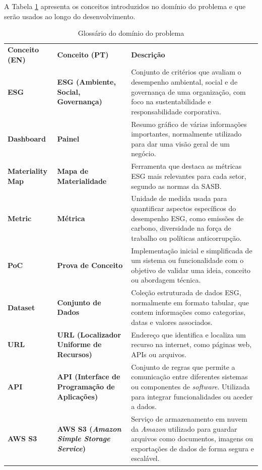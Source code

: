 A Tabela \ref{tab:glossario_dominio} apresenta os conceitos introduzidos no domínio do problema e que serão usados ao longo do desenvolvimento.

\begin{table}[H]
    \renewcommand{\arraystretch}{1.2}
    \setlength{\tabcolsep}{10pt}
    \centering
    \begin{tabular}{>{\bfseries}p{2.5cm} >{\bfseries}p{4cm} p{8cm}}
        \rowcolor{purple!40}
        Conceito (EN) & Conceito (PT) & \textbf{Descrição} \\
        ESG & ESG (Ambiente, Social, Governança) & Conjunto de critérios que avaliam o desempenho ambiental, social e de governança de uma organização, com foco na sustentabilidade e responsabilidade corporativa. \\
        Dashboard & Painel & Resumo gráfico de várias informações importantes, normalmente utilizado para dar uma visão geral de um negócio. \\
        Materiality Map & Mapa de Materialidade & Ferramenta que destaca as métricas ESG mais relevantes para cada setor, segundo as normas da SASB. \\
        Metric & Métrica & Unidade de medida usada para quantificar aspectos específicos do desempenho ESG, como emissões de carbono, diversidade na força de trabalho ou políticas anticorrupção. \\
        PoC & Prova de Conceito & Implementação inicial e simplificada de um sistema ou funcionalidade com o objetivo de validar uma ideia, conceito ou abordagem técnica. \\
        Dataset & Conjunto de Dados & Coleção estruturada de dados ESG, normalmente em formato tabular, que contem informações como categorias, datas e valores associados. \\
        URL & URL (Localizador Uniforme de Recursos) & Endereço que identifica e localiza um recurso na internet, como páginas web, APIs ou arquivos. \\
        API & API (Interface de Programação de Aplicações) & Conjunto de regras que permite a comunicação entre diferentes sistemas ou componentes de \textit{software}. Utilizada para integrar funcionalidades ou aceder a dados. \\
        AWS S3 & AWS S3 (\textit{Amazon Simple Storage Service}) & Serviço de armazenamento em nuvem da \textit{Amazon} utilizado para guardar arquivos como documentos, imagens ou exportações de dados de forma segura e escalável. \\
    \end{tabular}
    \caption{Glossário do domínio do problema}
    \label{tab:glossario_dominio}
\end{table}


